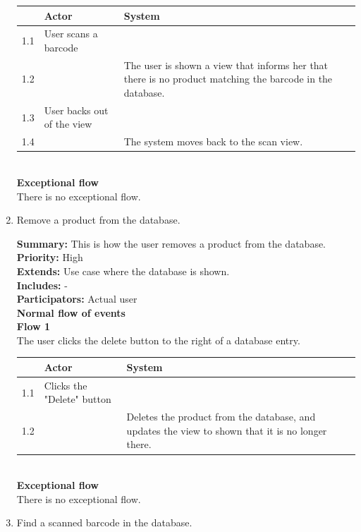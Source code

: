 \documentclass{report}
\begin{document}
\begin{enumerate}
    \begin{tabular}{ | l | p{4cm} | p{4cm} |}
    \hline
      & Actor & System \\ \hline
    1.1 & User scans a barcode & \\ \hline
    1.2 & & The user is shown a view that informs her that there is no product matching the barcode in the database. \\ \hline
    1.3 & User backs out of the view & \\ \hline
    1.4 & & The system moves back to the scan view. \\
    \hline
    \end{tabular} \\

    \textbf{Exceptional flow} \\ There is no exceptional flow.

\pagebreak

  \item Remove a product from the database. \

    \textbf{Summary:} This is how the user removes a product from the database. \\
    \textbf{Priority:} High \\
    \textbf{Extends:} Use case where the database is shown. \\
    \textbf{Includes:} - \\
    \textbf{Participators:} Actual user \\
    \textbf{Normal flow of events} \\
    \textbf{Flow 1} \\ The user clicks the delete button to the right of a database entry. \\

    \begin{tabular}{ | l | p{4cm} | p{4cm} |}
    \hline
      & Actor & System \\ \hline
    1.1 & Clicks the "Delete" button & \\ \hline
    1.2 & & Deletes the product from the database, and updates the view to shown that it is no longer there. \\
    \hline
    \end{tabular} \\

    \textbf{Exceptional flow} \\ There is no exceptional flow.

\pagebreak

  \item Find a scanned barcode in the database. \


\end{enumerate}
\end{document}
